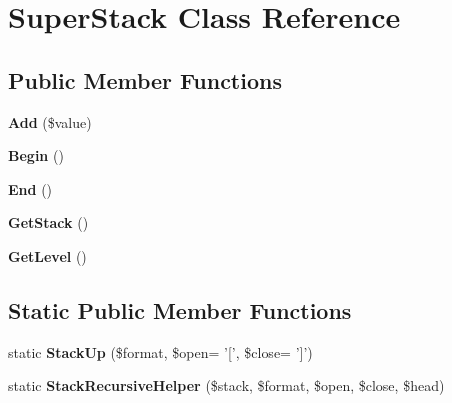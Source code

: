 \hypertarget{class_tools_1_1_super_stack_1_1_super_stack}{
\section{\-Super\-Stack \-Class \-Reference}
\label{class_tools_1_1_super_stack_1_1_super_stack}
}
\subsection*{\-Public \-Member \-Functions}
\begin{DoxyCompactItemize}
\item 
\hypertarget{class_tools_1_1_super_stack_1_1_super_stack_adba54dcf151f66452c90a611156020c5}{
{\bfseries \-Add} (\$value)}
\label{class_tools_1_1_super_stack_1_1_super_stack_adba54dcf151f66452c90a611156020c5}

\item 
\hypertarget{class_tools_1_1_super_stack_1_1_super_stack_a8ce592cbeb3f89a3551c138ca56b6a65}{
{\bfseries \-Begin} ()}
\label{class_tools_1_1_super_stack_1_1_super_stack_a8ce592cbeb3f89a3551c138ca56b6a65}

\item 
\hypertarget{class_tools_1_1_super_stack_1_1_super_stack_a5bed415bfef46529e2d92a8dc358feb3}{
{\bfseries \-End} ()}
\label{class_tools_1_1_super_stack_1_1_super_stack_a5bed415bfef46529e2d92a8dc358feb3}

\item 
\hypertarget{class_tools_1_1_super_stack_1_1_super_stack_ac6e60bf1d35a1323ebdd0c244ab52da4}{
{\bfseries \-Get\-Stack} ()}
\label{class_tools_1_1_super_stack_1_1_super_stack_ac6e60bf1d35a1323ebdd0c244ab52da4}

\item 
\hypertarget{class_tools_1_1_super_stack_1_1_super_stack_afe2924b84c7e0f80a1a6e76509da683b}{
{\bfseries \-Get\-Level} ()}
\label{class_tools_1_1_super_stack_1_1_super_stack_afe2924b84c7e0f80a1a6e76509da683b}

\end{DoxyCompactItemize}
\subsection*{\-Static \-Public \-Member \-Functions}
\begin{DoxyCompactItemize}
\item 
\hypertarget{class_tools_1_1_super_stack_1_1_super_stack_ab6cb59b91e1ad9ec1d0d5104a5d6c681}{
static {\bfseries \-Stack\-Up} (\$format, \$open= '\mbox{[}', \$close= '\mbox{]}')}
\label{class_tools_1_1_super_stack_1_1_super_stack_ab6cb59b91e1ad9ec1d0d5104a5d6c681}

\item 
\hypertarget{class_tools_1_1_super_stack_1_1_super_stack_ad040442984d0c5b635a30c3096130dd3}{
static {\bfseries \-Stack\-Recursive\-Helper} (\$stack, \$format, \$open, \$close, \$head)}
\label{class_tools_1_1_super_stack_1_1_super_stack_ad040442984d0c5b635a30c3096130dd3}

\end{DoxyCompactItemize}
